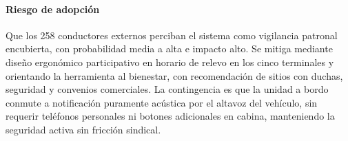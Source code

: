 \paragraph{Riesgo de adopción} Que los 258 conductores externos perciban el sistema como vigilancia
patronal encubierta, con probabilidad media a alta e impacto alto. Se mitiga mediante diseño
ergonómico participativo en horario de relevo en los cinco terminales y orientando la herramienta al
bienestar, con recomendación de sitios con duchas, seguridad y convenios comerciales. La contingencia
es que la unidad a bordo conmute a notificación puramente acústica por el altavoz del vehículo, sin
requerir teléfonos personales ni botones adicionales en cabina, manteniendo la seguridad activa sin
fricción sindical.

